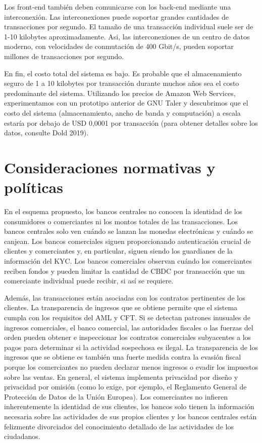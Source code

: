 \documentclass[10pt,spanish]{article}
\begin{document}
Los front-end también deben comunicarse con los back-end mediante una
interconexión. Las interconexiones puede soportar grandes cantidades de
transacciones por segundo. El tamaño de una transacción individual suele
ser de 1-10 kilobytes aproximadamente. Asi, las interconexiones de un
centro de datos moderno, con velocidades de conmutación de 400 Gbit/s,
pueden soportar millones de transacciones por segundo.

En fin, el costo total del sistema es bajo. Es probable que el
almacenamiento seguro de 1 a 10 kilobytes por transacción durante muchos
años sea el costo predominante del sistema. Utilizando los precios de
Amazon Web Services, experimentamos con un prototipo anterior de GNU
Taler y descubrimos que el costo del sistema (almacenamiento, ancho de
banda y computación) a escala estaría por debajo de USD 0,0001 por
transacción (para obtener detalles sobre los datos, consulte Dold 2019).

\hypertarget{consideraciones-normativas-y-poluxedticas}{%
\section{Consideraciones normativas y políticas}\label{5.-consideraciones-normativas-y-poluxedticas}}

En el esquema propuesto, los bancos centrales no conocen la identidad de
los consumidores o comerciantes ni los montos totales de las
transacciones. Los bancos centrales solo ven cuándo se lanzan las
monedas electrónicas y cuándo se canjean. Los bancos comerciales siguen
proporcionando autenticación crucial de clientes y comerciantes y, en
particular, siguen siendo los guardianes de la información del KYC. Los
bancos comerciales observan cuándo los comerciantes reciben fondos y
pueden limitar la cantidad de CBDC por transacción que un comerciante
individual puede recibir, si así se requiere.

Además, las transacciones están asociadas con los contratos pertinentes
de los clientes. La transparencia de ingresos que se obtiene permite que
el sistema cumpla con los requisitos del AML y CFT. Si se detectan
patrones inusuales de ingresos comerciales, el banco comercial, las
autoridades fiscales o las fuerzas del orden pueden obtener e
inspeccionar los contratos comerciales subyacentes a los pagos para
determinar si la actividad sospechosa es ilegal. La transparencia de los
ingresos que se obtiene es también una fuerte medida contra la evasión
fiscal porque los comerciantes no pueden declarar menos ingresos o
evadir los impuestos sobre las ventas. En general, el sistema implementa
privacidad por diseño y privacidad por omisión (como lo exige, por
ejemplo, el Reglamento General de Protección de Datos de la Unión
Europea). Los comerciantes no infieren inherentemente la identidad de
sus clientes, los bancos solo tienen la información necesaria sobre las
actividades de sus propios clientes y los bancos centrales están
felizmente divorciados del conocimiento detallado de las actividades de
los ciudadanos.
\end{document}

